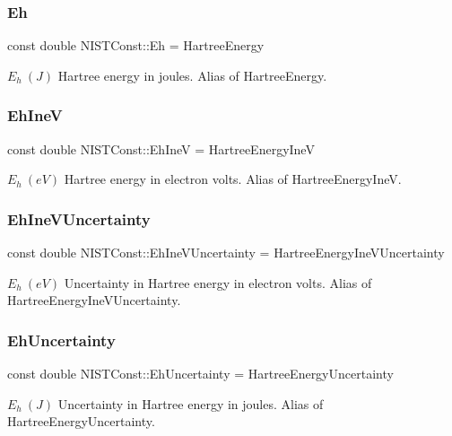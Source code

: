 \subsubsection{\texorpdfstring{Eh}{Eh}}
{\footnotesize\ttfamily const double N\+I\+S\+T\+Const\+::\+Eh = Hartree\+Energy}

$E_h \ (J)$ Hartree energy in joules. Alias of Hartree\+Energy. \mbox{\label{group___hartree_energy_ga45991f1895507078b66f94f85e2e8af5}} 
\subsubsection{\texorpdfstring{Eh\+IneV}{EhIneV}}
{\footnotesize\ttfamily const double N\+I\+S\+T\+Const\+::\+Eh\+IneV = Hartree\+Energy\+IneV}

$E_h \ (eV)$ Hartree energy in electron volts. Alias of Hartree\+Energy\+IneV. \mbox{\label{group___hartree_energy_ga44de589dbe84c79573b441fa366d320d}} 
\subsubsection{\texorpdfstring{Eh\+Ine\+V\+Uncertainty}{EhIneVUncertainty}}
{\footnotesize\ttfamily const double N\+I\+S\+T\+Const\+::\+Eh\+Ine\+V\+Uncertainty = Hartree\+Energy\+Ine\+V\+Uncertainty}

$E_h \ (eV)$ Uncertainty in Hartree energy in electron volts. Alias of Hartree\+Energy\+Ine\+V\+Uncertainty. \mbox{\label{group___hartree_energy_ga52137cfba941de2bd3b1b584bd1f31ee}} 
\subsubsection{\texorpdfstring{Eh\+Uncertainty}{EhUncertainty}}
{\footnotesize\ttfamily const double N\+I\+S\+T\+Const\+::\+Eh\+Uncertainty = Hartree\+Energy\+Uncertainty}

$E_h \ (J)$ Uncertainty in Hartree energy in joules. Alias of Hartree\+Energy\+Uncertainty. \mbox{\label{group___hartree_energy_gab58dc1c4e59e83d4fb1217778fe9f29b}} 
